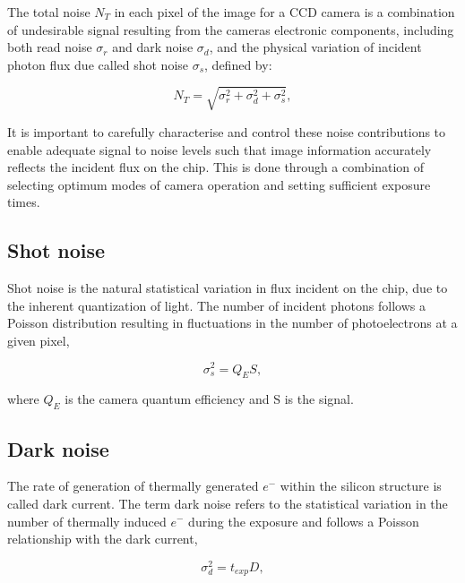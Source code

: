 \documentclass[twoside]{bhamthesis}
\theoremstyle{definition}
\begin{document}
\label{Appendix:Noise}
The total noise $N_T$ in each pixel of the image for a CCD camera is a combination of undesirable signal resulting from the cameras electronic components, including both read noise $\sigma_r$ and dark noise $\sigma_d$, and the physical variation of incident photon flux due called shot noise $\sigma_s$, defined by:

\begin{equation}
{ N_T= \sqrt{ \sigma_r^2 + \sigma_d^2 + \sigma_s^2}},
  \label{eqn:total_noise}
\end{equation}

It is important to carefully characterise and control these noise contributions to enable adequate signal to noise levels such that image information accurately reflects the incident flux on the chip. This is done through a combination of selecting optimum modes of camera operation and setting sufficient exposure times.

\subsection{Shot noise} 

Shot noise is the natural statistical variation in flux incident on the chip, due to the inherent quantization of light. The number of incident photons follows a Poisson distribution resulting in fluctuations in the number of photoelectrons at a given pixel,

\begin{equation}
{ \sigma_s^2 = Q_ES},
  \label{eqn:dark_noise}
\end{equation}

where $Q_E$ is the camera quantum efficiency and S is the signal.

\subsection{Dark noise} 
\label{Appendix:Dark_noise}

The rate of generation of thermally generated $e^-$ within the silicon structure is called dark current. The term dark noise refers to the statistical variation in the number of thermally induced $e^-$ during the exposure and follows a Poisson relationship with the dark current,

\begin{equation}
{ \sigma_d^2 = t_{exp}D},
  \label{eqn:dark_noise}
\end{equation}
\end{document}
